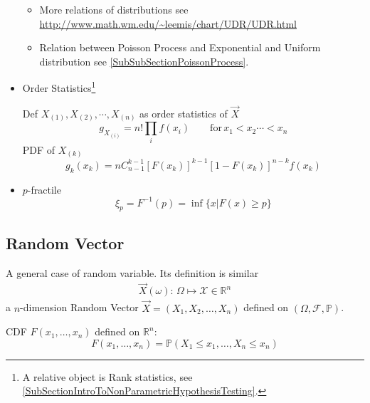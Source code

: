 \begin{itemize}
\begin{itemize}[topsep=2pt,itemsep=0pt]
            
            
            
            \item More relations of distributions see \url{http://www.math.wm.edu/~leemis/chart/UDR/UDR.html}
            \item Relation between Poisson Process and Exponential and Uniform distribution see \autoref{SubSubSectionPoissonProcess}.
            
            
        \end{itemize}
        
        \item Order Statistics\footnote{A relative object is Rank statistics, see \autoref{SubSectionIntroToNonParametricHypothesisTesting}.}
        
        Def $X_{(1)},X_{(2)},\cdots,X_{(n)}$ as order statistics of $\vec{X}$
        \begin{equation}    
            g_{X_{(i)}}=n!\prod_i f(x_i)\qquad \mathrm{for}\, x_1<x_2\cdots <x_n    
        \end{equation}
        PDF of $X_{(k)}$
        \begin{equation}\label{EqaDistributionOfOrderStatistics} 
            g_k(x_k)=nC_{n-1}^{k-1}[F(x_k)]^{k-1}[1-F(x_k)]^{n-k}f(x_k)
        \end{equation}
        \item $p$-fractile
        \begin{equation}    \xi_p=F^{-1}(p)=\inf\{x|F(x)\geq p\}\end{equation}
    \end{itemize}






\subsection{Random Vector}
    A general case of random variable. Its definition is similar    
    \begin{align}
        \vec{X}(\omega ):\, \Omega \mapsto \mathscr{X}\in\mathbb{R}^n 
    \end{align}
    a $n$-dimension Random Vector $\vec{X}=(X_1,X_2,\ldots,X_n)$ defined on $(\Omega,\mathscr{F},\mathbb{P})$.

    CDF $F(x_1,\ldots,x_n)$ defined on $\mathbb{R}^n$:
    \begin{equation}F(x_1,\ldots,x_n)=\mathbb{P}(X_1\leq x_1,\ldots,X_n\leq x_n)\end{equation}

